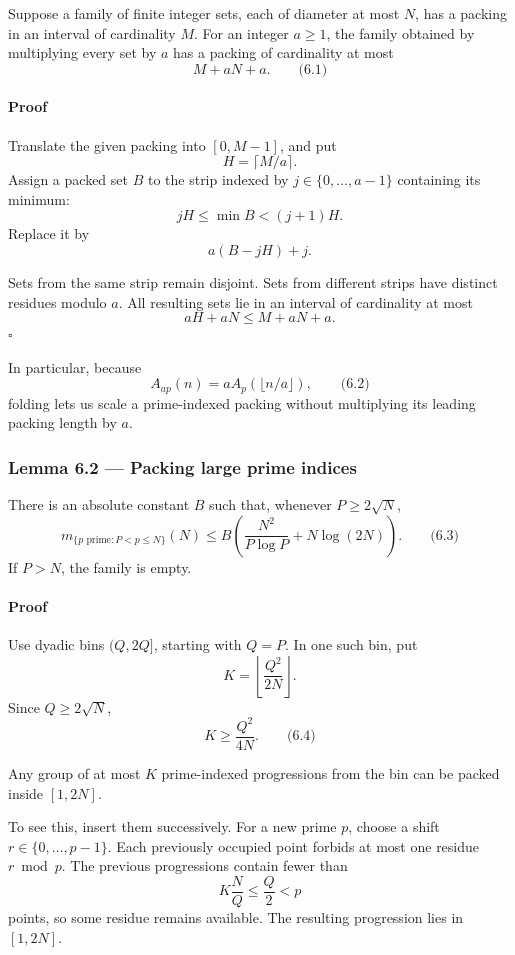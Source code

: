 \documentclass[
  11pt,
  a4paper,
]{article}
\begin{document}
Suppose a family of finite integer sets, each of diameter at most \(N\),
has a packing in an interval of cardinality \(M\). For an integer
\(a\ge1\), the family obtained by multiplying every set by \(a\) has a
packing of cardinality at most \[
M+aN+a.
\qquad\text{(6.1)}
\]

\paragraph{Proof}\label{proof-4}

Translate the given packing into \([0,M-1]\), and put \[
H=\lceil M/a\rceil.
\] Assign a packed set \(B\) to the strip indexed by
\(j\in\{0,\ldots,a-1\}\) containing its minimum: \[
jH\le \min B<(j+1)H.
\] Replace it by \[
a(B-jH)+j.
\]

Sets from the same strip remain disjoint. Sets from different strips
have distinct residues modulo \(a\). All resulting sets lie in an
interval of cardinality at most \[
aH+aN\le M+aN+a.
\] \(\square\)

In particular, because \[
A_{ap}(n)=aA_p(\lfloor n/a\rfloor),
\qquad\text{(6.2)}
\] folding lets us scale a prime-indexed packing without multiplying its
leading packing length by \(a\).

\subsubsection{Lemma 6.2 --- Packing large prime
indices}\label{lemma-6.2-packing-large-prime-indices}

There is an absolute constant \(B\) such that, whenever
\(P\ge2\sqrt N\), \[
m_{\{p\text{ prime}:P<p\le N\}}(N)
\le
B\left(
\frac{N^2}{P\log P}+N\log(2N)
\right).
\qquad\text{(6.3)}
\] If \(P>N\), the family is empty.

\paragraph{Proof}\label{proof-5}

Use dyadic bins \((Q,2Q]\), starting with \(Q=P\). In one such bin, put
\[
K=\left\lfloor\frac{Q^2}{2N}\right\rfloor.
\] Since \(Q\ge2\sqrt N\), \[
K\ge\frac{Q^2}{4N}.
\qquad\text{(6.4)}
\]

Any group of at most \(K\) prime-indexed progressions from the bin can
be packed inside \([1,2N]\).

To see this, insert them successively. For a new prime \(p\), choose a
shift \(r\in\{0,\ldots,p-1\}\). Each previously occupied point forbids
at most one residue \(r\bmod p\). The previous progressions contain
fewer than \[
K\frac NQ\le \frac Q2<p
\] points, so some residue remains available. The resulting progression
lies in \([1,2N]\).
\end{document}
